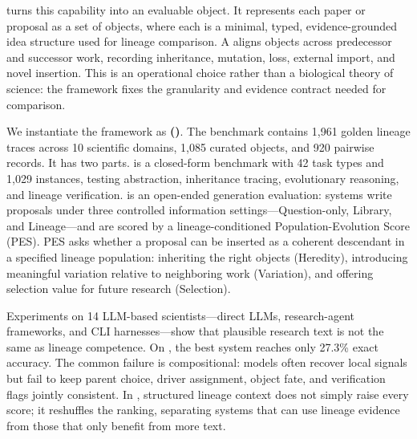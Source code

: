 \ideagene{} turns this capability into an evaluable object. It represents each paper or proposal as a set of \textbf{\genome{}} objects, where each \genome{} is a minimal, typed, evidence-grounded idea structure used for lineage comparison. A \textbf{\genomediff{}} aligns \genome{} objects across predecessor and successor work, recording inheritance, mutation, loss, external import, and novel insertion. This is an operational choice rather than a biological theory of science: the framework fixes the granularity and evidence contract needed for comparison.

We instantiate the framework as \textbf{\igbenchfull{} (\igbench{})}. The benchmark contains 1,961 golden lineage traces across 10 scientific domains, 1,085 curated \genome{} objects, and 920 pairwise \genomediff{} records. It has two parts. \geneexam{} is a closed-form benchmark with 42 task types and 1,029 instances, testing \genome{} abstraction, inheritance tracing, evolutionary reasoning, and lineage verification. \genearena{} is an open-ended generation evaluation: systems write proposals under three controlled information settings---Question-only, Library, and Lineage---and are scored by a lineage-conditioned Population-Evolution Score (PES). PES asks whether a proposal can be inserted as a coherent descendant in a specified lineage population: inheriting the right \genome{} objects (Heredity), introducing meaningful variation relative to neighboring work (Variation), and offering selection value for future research (Selection).

Experiments on 14 LLM-based scientists---direct LLMs, research-agent frameworks, and CLI harnesses---show that plausible research text is not the same as lineage competence. On \geneexam{}, the best system reaches only 27.3\% exact accuracy. The common failure is compositional: models often recover local signals but fail to keep parent choice, driver assignment, object fate, and verification flags jointly consistent. In \genearena{}, structured lineage context does not simply raise every score; it reshuffles the ranking, separating systems that can use lineage evidence from those that only benefit from more text.


